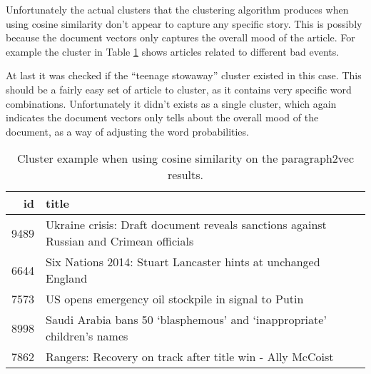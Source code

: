 Unfortunately the actual clusters that the clustering algorithm produces when using cosine similarity don't appear to capture any specific story. This is possibly because the document vectors only captures the overall mood of the article. For example the cluster in Table \ref{table:paragraph2vec:example} shows articles related to different bad events.

At last it was checked if the ``teenage stowaway'' cluster existed in this case. This should be a fairly easy set of article to cluster, as it contains very specific word combinations. Unfortunately it didn't exists as a single cluster, which again indicates the document vectors only tells about the overall mood of the document, as a way of adjusting the word probabilities.

\begin{table}[H]
\centering
\begin{tabular}{r|p{10cm}}
id & title \\ \hline
  9489 & Ukraine crisis: Draft document reveals sanctions against Russian and Crimean officials \\
  6644 & Six Nations 2014: Stuart Lancaster hints at unchanged England \\
  7573 & US opens emergency oil stockpile in signal to Putin \\
  8998 & Saudi Arabia bans 50 ‘blasphemous’ and ‘inappropriate’ children’s names \\
  7862 & Rangers: Recovery on track after title win - Ally McCoist
\end{tabular}
\caption{Cluster example when using cosine similarity on the paragraph2vec results.}
\label{table:paragraph2vec:example}
\end{table}
